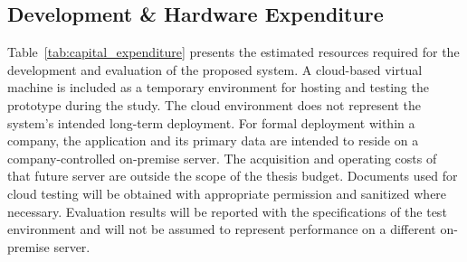 \subsection{Development \& Hardware Expenditure}
\label{sec:dev_expenditure}

Table~\ref{tab:capital_expenditure} presents the estimated resources required for the development and evaluation of the proposed system. A cloud-based virtual machine is included as a temporary environment for hosting and testing the prototype during the study. The cloud environment does not represent the system's intended long-term deployment. For formal deployment within a company, the application and its primary data are intended to reside on a company-controlled on-premise server. The acquisition and operating costs of that future server are outside the scope of the thesis budget. Documents used for cloud testing will be obtained with appropriate permission and sanitized where necessary. Evaluation results will be reported with the specifications of the test environment and will not be assumed to represent performance on a different on-premise server.

\begin{table}[H]
\centering
\caption{Estimated development and testing expenditure}
\label{tab:capital_expenditure}
\begin{singlespace}
\end{singlespace}
\end{table}

